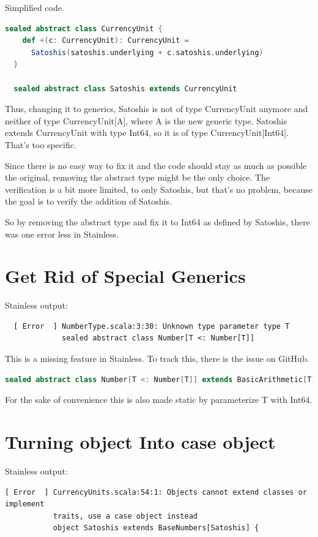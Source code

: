 Simplified code.
\begin{lstlisting}[language=scala]
  sealed abstract class CurrencyUnit {
    def +(c: CurrencyUnit): CurrencyUnit =
      Satoshis(satoshis.underlying + c.satoshis.underlying)
  }

  sealed abstract class Satoshis extends CurrencyUnit
\end{lstlisting}

Thus, changing it to generics, Satoshis is not of type CurrencyUnit anymore and neither of type CurrencyUnit[A], where A is the new generic type.
Satoshis extends CurrencyUnit with type Int64, so it is of type CurrencyUnit[Int64].
That's too specific.

Since there is no easy way to fix it and the code should stay as much as possible the original, removing the abstract type might be the only choice.
The verification is a bit more limited, to only Satoshis, but that's no problem, because the goal is to verify the addition of Satoshis.

So by removing the abstract type and fix it to Int64 as defined by Satoshis, there was one error less in Stainless.


\section{Get Rid of Special Generics}
Stainless output:
{\footnotesize\begin{verbatim}
  [ Error  ] NumberType.scala:3:30: Unknown type parameter type T
             sealed abstract class Number[T <: Number[T]]
\end{verbatim}}

This is a missing feature in Stainless.
To track this, there is the issue  on GitHub.
\begin{lstlisting}[language=scala]
  sealed abstract class Number[T <: Number[T]] extends BasicArithmetic[T]  
\end{lstlisting}
For the sake of convenience this is also made static by parameterize T with Int64.


\section{Turning object Into case object}
Stainless output:
{\footnotesize\begin{verbatim}
[ Error  ] CurrencyUnits.scala:54:1: Objects cannot extend classes or implement
           traits, use a case object instead
           object Satoshis extends BaseNumbers[Satoshis] {
\end{verbatim}}

